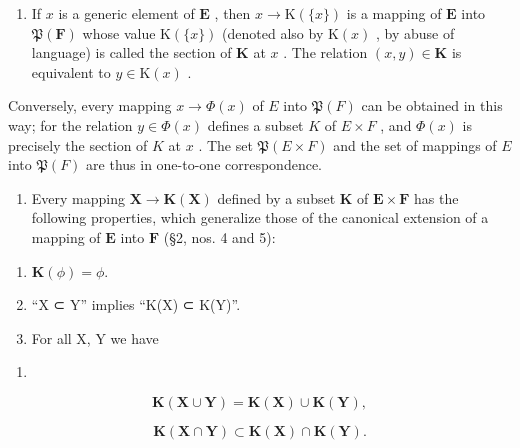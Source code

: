 \begin{enumerate}
\def\labelenumi{\arabic{enumi}.}
\setcounter{enumi}{6}
\tightlist
\item
  If \(x\) is a generic element of \(\mathbf{E}\) , then \(x \to \mathrm{K}(\{x\})\) is a mapping of \(\mathbf{E}\) into \(\mathfrak{P}(\mathbf{F})\) whose value \(\mathrm{K}(\{x\})\) (denoted also by \(\mathrm{K}(x)\) , by abuse of language) is called the section of \(\mathbf{K}\) at \(x\) . The relation \((x, y) \in \mathbf{K}\) is equivalent to \(y \in \mathrm{K}(x)\) .
\end{enumerate}

Conversely, every mapping \(x \to \Phi(x)\) of \(E\) into \(\mathfrak{P}(F)\) can be obtained in this way; for the relation \(y \in \Phi(x)\) defines a subset \(K\) of \(E \times F\) , and \(\Phi(x)\) is precisely the section of \(K\) at \(x\) . The set \(\mathfrak{P}(E \times F)\) and the set of mappings of \(E\) into \(\mathfrak{P}(F)\) are thus in one-to-one correspondence.

\begin{enumerate}
\def\labelenumi{\arabic{enumi}.}
\setcounter{enumi}{7}
\tightlist
\item
  Every mapping \(\mathbf{X} \to \mathbf{K}(\mathbf{X})\) defined by a subset \(\mathbf{K}\) of \(\mathbf{E} \times \mathbf{F}\) has the following properties, which generalize those of the canonical extension of a mapping of \(\mathbf{E}\) into \(\mathbf{F}\) (§2, nos. 4 and 5):
\end{enumerate}

\begin{enumerate}
\def\labelenumi{(\alph{enumi})}
\item
  \(\mathbf{K}(\phi)=\phi.\)
\item
  ``X ⊂ Y'' implies ``K(X) ⊂ K(Y)''.
\item
  For all X, Y we have
\end{enumerate}

\begin{enumerate}
\def\labelenumi{(\arabic{enumi})}
\setcounter{enumi}{27}
\tightlist
\item
\end{enumerate}

\[
\mathbf {K} (\mathbf {X} \cup \mathbf {Y}) = \mathbf {K} (\mathbf {X}) \cup \mathbf {K} (\mathbf {Y}),\tag{29}
\]

\[
\mathbf {K} (\mathbf {X} \cap \mathbf {Y}) \subset \mathbf {K} (\mathbf {X}) \cap \mathbf {K} (\mathbf {Y}).
\]

